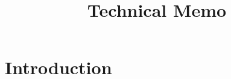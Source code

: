 \documentclass{technical}
\title{Technical Memo}
\author{\authorname{joey}}
\begin{document}
\maketitle

\section{Introduction}
\lipsum[1]
\end{document}
